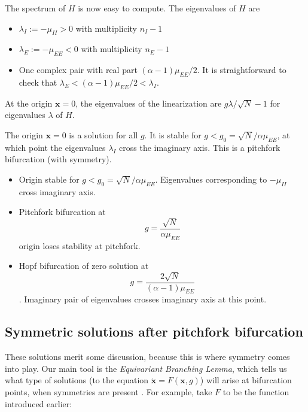 \documentclass[11pt,reqno]{amsart}
\newcommand{\xvec}{\mathbf{x}}
\begin{document}
The spectrum of $H$ is now easy to compute. The eigenvalues of $H$ are

\begin{itemize}
    \item $\lambda_I := -\mu_{II} > 0$ with multiplicity $n_I - 1$
    \item $\lambda_E := -\mu_{EE} < 0$ with multiplicity $n_E - 1$
    \item One complex pair with real part $(\alpha - 1)\mu_{EE}/2$. It is straightforward to check that $\lambda_E < (\alpha - 1)\mu_{EE}/2 < \lambda_I$.
\end{itemize}
At the origin $\xvec = 0$, the eigenvalues of the linearization are $g \lambda / \sqrt{N} - 1$ for eigenvalues $\lambda$ of $H$.

The origin $\xvec = 0$ is a solution for all $g$. It is stable for $g < g_0 = \sqrt{N}/\alpha \mu_{EE}$, at which point the eigenvalues $\lambda_I$ cross the imaginary axis. This is a pitchfork bifurcation (with symmetry).
\begin{itemize}
    \item Origin stable for $g < g_0 = \sqrt{N}/\alpha \mu_{EE}$. Eigenvalues corresponding to $-\mu_{II}$ cross imaginary axis.
    \item Pitchfork bifurcation at 
    \begin{equation}\label{eq:pitchlocation}
        g = \frac{\sqrt{N}}{\alpha \mu_{EE}}
    \end{equation}
    origin loses stability at pitchfork.
    \item Hopf bifurcation of zero solution at 
    \begin{equation}\label{eq:0hopflocation}
        g = \frac{ 2\sqrt{N} }{ (\alpha-1)\mu_{EE} }
    \end{equation}. Imaginary pair of eigenvalues crosses imaginary axis at this point.
\end{itemize}

\subsection{Symmetric solutions after pitchfork bifurcation}
These solutions merit some discussion, because this is where symmetry comes into play. 
 Our main tool is the \textit{Equivariant Branching Lemma}, which tells us what type of solutions (to the equation $\dot{\xvec} = F(\xvec, g)$) will arise at bifurcation points, when symmetries are present \cite{MR631456,GSS88Vol2,HoyleRebeccaB2006Pf:a}. For example, take $F$ to be the function introduced earlier: 
\end{document}
